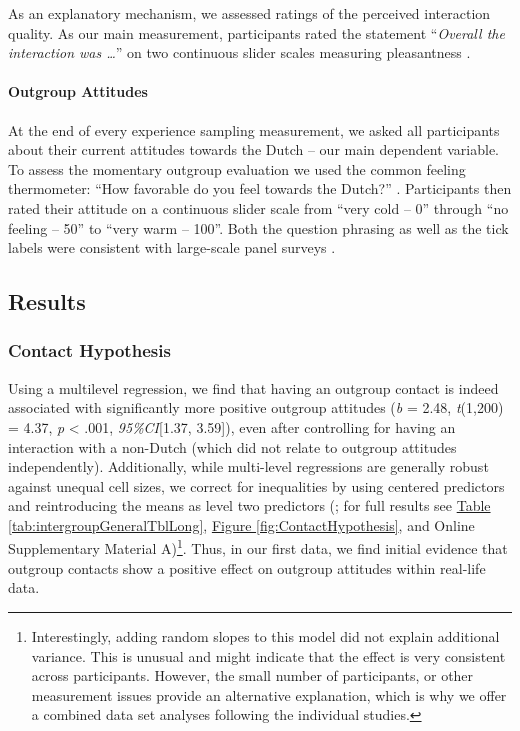 \documentclass[man, 12pt, a4paper, mask]{apa7}
\theoremstyle{break}
\theoremstyle{plain}
\newcommand{\fgrref}[2][]{\hyperref[#2]{Figure \ref*{#2}#1}}
\newcommand{\tblref}[2][]{\hyperref[#2]{Table \ref*{#2}#1}}
\begin{document}
As an explanatory mechanism, we assessed ratings of the perceived
interaction quality. As our main measurement, participants rated the
statement ``\textit{Overall the interaction was …}'' on two continuous
slider scales measuring pleasantness
\citep[from unpleasant (-50) to pleasant (+50)) and meaningfulness (from superficial (-50) to meaningful (+50); both items adapted from][]{Downie2008}.

\paragraph{Outgroup Attitudes}

At the end of every experience sampling measurement, we asked all
participants about their current attitudes towards the Dutch -- our main
dependent variable. To assess the momentary outgroup evaluation we used
the common feeling thermometer: ``How favorable do you feel towards the
Dutch?'' \citep[][]{Lavrakas2008}. Participants then rated their
attitude on a continuous slider scale from ``very cold -- 0'' through
``no feeling -- 50'' to ``very warm -- 100''. Both the question phrasing
as well as the tick labels were consistent with large-scale panel
surveys \citep[e.g.,][]{DeBell2010}.

\subsection{Results}

\subsubsection{Contact Hypothesis}

Using a multilevel regression, we find that having an outgroup contact
is indeed associated with significantly more positive outgroup attitudes
(\textit{b} = 2.48, \textit{t}(1,200) = 4.37, \textit{p} \textless{}
.001, \textit{95\%CI}{[}1.37, 3.59{]}), even after controlling for
having an interaction with a non-Dutch (which did not relate to outgroup
attitudes independently). Additionally, while multi-level regressions
are generally robust against unequal cell sizes, we correct for
inequalities by using centered predictors and reintroducing the means as
level two predictors (\citealp{Yaremych2021}; for full results see
\tblref{tab:intergroupGeneralTblLong}, \fgrref{fig:ContactHypothesis},
and Online Supplementary Material
A)\footnote{Interestingly, adding random slopes to this model did not explain additional variance. This is unusual and might indicate that the effect is very consistent across participants. However, the small number of participants, or other measurement issues provide an alternative explanation, which is why we offer a combined data set analyses following the individual studies.}.
Thus, in our first data, we find initial evidence that outgroup contacts
show a positive effect on outgroup attitudes within real-life data.
\end{document}
